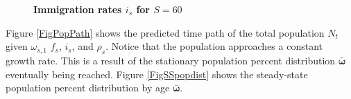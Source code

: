 \documentclass[letterpaper,12pt]{article}
\theoremstyle{definition}
\begin{document}
  \begin{figure}[htbp]\centering \captionsetup{width=4.0in}
    \caption{\label{FigImmigRates}\textbf{Immigration rates $i_s$ for $S=60$}}
  \end{figure}

  Figure \ref{FigPopPath} shows the predicted time path of the total population $N_t$ given $\omega_{s,1}$ $f_s$, $i_s$, and $\rho_s$. Notice that the population approaches a constant growth rate. This is a result of the stationary population percent distribution $\bm{\bar{\omega}}$ eventually being reached. Figure \ref{FigSSpopdist} shows the steady-state population percent distribution by age $\bm{\bar{\omega}}$.
\end{document}
